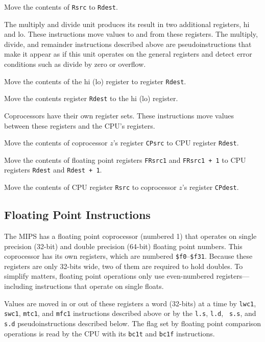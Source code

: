 \documentclass[11pt]{article}
\begin{document}
Move the contents of {\tt Rsrc} to {\tt Rdest}.

\bigskip

The multiply and divide unit produces its result in two additional
registers, hi and lo.  These instructions move values to and from
these registers.  The multiply, divide, and remainder instructions
described above are pseudoinstructions that make it appear as if this
unit operates on the general registers and detect error conditions
such as divide by zero or overflow.

Move the contents of the hi (lo) register to register {\tt Rdest}.

Move the contents register {\tt Rdest} to the hi (lo) register.

\bigskip

Coprocessors have their own register sets.  These instructions move
values between these registers and the CPU's registers.

Move the contents of coprocessor $z$'s register {\tt CPsrc} to CPU
register {\tt Rdest}.

Move the contents of floating point registers {\tt FRsrc1} and
{\tt FRsrc1 + 1} to CPU registers {\tt Rdest} and {\tt Rdest + 1}.

Move the contents of CPU register {\tt Rsrc} to coprocessor $z$'s
register {\tt CPdest}.


\subsection{Floating Point Instructions}

The MIPS has a floating point coprocessor (numbered 1) that operates
on single precision (32-bit) and double precision (64-bit) floating
point numbers.  This coprocessor has its own registers, which are
numbered {\tt \$f0}--{\tt \$f31}.  Because these registers are only
32-bits wide, two of them are required to hold doubles. To simplify
matters, floating point operations only use even-numbered
registers---including instructions that operate on single floats.

Values are moved in or out of these registers a word (32-bits) at a
time by {\tt lwc1}, {\tt swc1}, {\tt mtc1}, and {\tt mfc1}
instructions described above or by the {\tt l.s}, {\tt l.d}, {\tt
s.s}, and {\tt s.d} pseudoinstructions described below.  The flag set
by floating point comparison operations is read by the CPU with its
{\tt bc1t} and {\tt bc1f} instructions.
\end{document}
